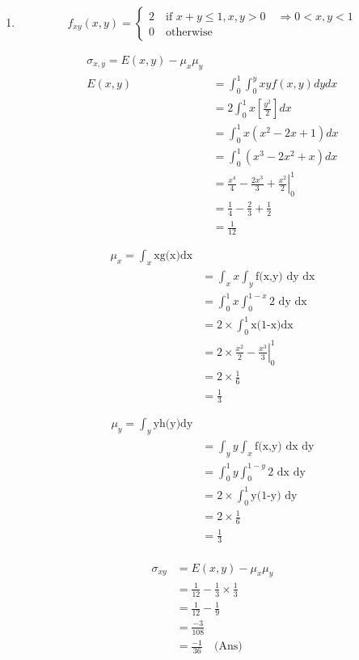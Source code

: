\documentclass[a4paper, 12pt]{article}
\begin{document}
\begin{enumerate}
	\item 
		\[
			f_{xy}(x,y) = 
			\begin{cases}
				2 \quad \text{if } x+y \leq 1, x,y > 0 
				\quad \Rightarrow 0 < x,y < 1\\
				0 \quad \text{otherwise}
			\end{cases}
		\]	

		\begin{align*}
			\sigma_{x,y} = E(x,y) - \mu_x \mu_y\\
			E(x,y) &= \int_0^1 \int_0^y xyf(x,y) dydx\\
			&= 2\int_0^1 x\left[\frac{y^2}{2}\right] dx\\
			&= \int_0^1 x(x^2 -2x +1) dx\\
			&= \int_0^1 (x^3 -2x^2 +x) dx\\
			&= \left.\frac{x^4}{4} -\frac{2x^3}{3} +\frac{x^2}{2} \right|_0^1\\
			&= \frac{1}{4} - \frac{2}{3} +\frac{1}{2}\\
			&= \frac{1}{12}\\
		\end{align*}
		\begin{align*}
			\\
			\mu_x = \int_x \textrm{xg(x)} \textrm{dx}\\
			&= \int_x x \int_y \textrm{f(x,y) dy dx}\\
			&= \int_0^1 x \int_0^{1-x} \textrm{2 dy dx}\\
			&= 2\times\int_0^1 \textrm{x(1-x)dx}\\
			&= 2\times \left. \frac{x^2}{2} -\frac{x^3}{3}
			\right|_0^1\\ 
			&= 2\times\frac{1}{6}\\
			&= \frac{1}{3}\\
		\end{align*}
		\begin{align*}
			\\
			\mu_y = \int_y \textrm{yh(y)dy}\\
			&= \int_y y \int_x \textrm{f(x,y) dx dy}\\
			&= \int_0^1 y \int_0^{1-y} \textrm{2 dx dy}\\
			&= 2\times\int_0^1 \textrm{y(1-y) dy}\\
			&= 2\times\frac{1}{6}\\
			&= \frac{1}{3}\\
			\\
		\end{align*}
		\begin{align*}
			\\
			\sigma_{xy} &= E(x,y)-\mu_x\mu_y\\
			&= \frac{1}{12} - \frac{1}{3}\times\frac{1}{3}\\
			&= \frac{1}{12} - \frac{1}{9}\\
			&= \frac{-3}{108}\\
			&= \frac{-1}{36} \quad\textrm{(Ans)}
		\end{align*}				
		

\end{enumerate}
\end{document}
